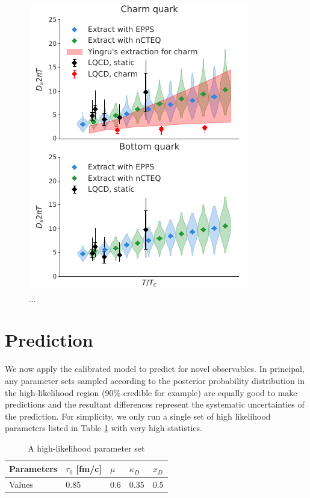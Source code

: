 \documentclass[aps, prc, reprint, amsmath, groupedaddress, nofootinbib]{revtex4-1}
\begin{document}
\begin{figure}
\includegraphics[width=\columnwidth]{Ds_posterior.pdf}
\caption{...}\label{plots:posterior_Ds}
\end{figure}

\section{Prediction}\label{section:prediction}
We now apply the calibrated model to predict for novel observables.
In principal, any parameter sets sampled according to the posterior probability distribution in the high-likelihood region (90\% credible for example) are equally good to make predictions and the resultant differences represent the systematic uncertainties of the prediction.
For simplicity, we only run a single set of high likelihood parameters listed in Table \ref{table:high-likelihood-parameters} with very high statistics.
\begin{table}
\caption{A high-likelihood parameter set}\label{table:high-likelihood-parameters}
\begin{tabularx}{\columnwidth}{XXXXX}
\hline
Parameters & $\tau_0$ [fm/c] & $\mu$ & $\kappa_D$ & $x_D$   \\
\hline
Values & 0.85 & 0.6 & 0.35 & 0.5\\
\hline
\end{tabularx}
\end{table} 
\end{document}
